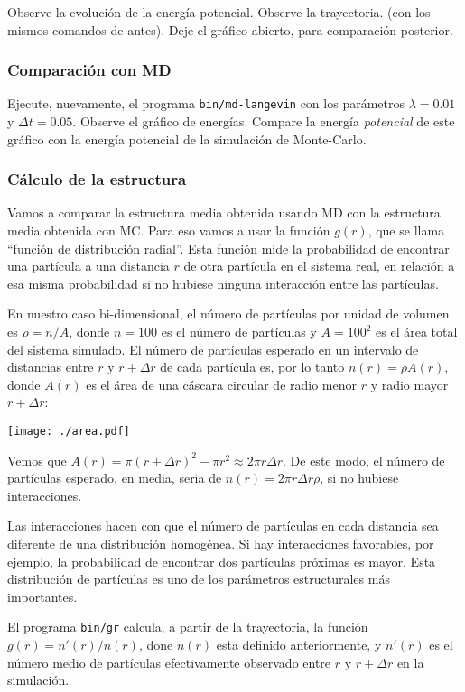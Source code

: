 \documentclass[10pt,a4paper,ssfamily]{exam}
\newcommand{\1}{{\bf 1}}
\newcommand{\2}{{\bf 2}}
\newcommand{\3}{{\bf 3}}
\begin{document}
Observe la evolución de la energía potencial. Observe la trayectoria. 
(con los mismos comandos de antes). Deje el gráfico abierto, para
comparación posterior. 

\subsubsection{Comparación con MD}

Ejecute, nuevamente, el programa {\tt bin/md-langevin} con los
parámetros $\lambda=0.01$ y $\Delta t=0.05$. Observe el gráfico
de energías. Compare la energía {\it potencial} de este gráfico con la
energía potencial de la simulación de Monte-Carlo.

\subsubsection{Cálculo de la estructura}

Vamos a comparar la estructura media obtenida usando MD con la
estructura media obtenida con MC. Para eso vamos a usar la función
$g(r)$, que se llama ``función de distribución radial''. 
Esta función mide la probabilidad de encontrar una partícula a
una distancia $r$ de otra partícula en el sistema real, en relación a
esa misma probabilidad si no hubiese ninguna interacción entre las
partículas. 

En nuestro caso bi-dimensional, el número de partículas por unidad de
volumen es $\rho=n/A$, donde $n=100$ es el número de partículas y $A=100^2$
es el área total del sistema simulado. El número de partículas esperado
en un intervalo de distancias entre $r$ y $r+\Delta r$ de cada partícula
es, por lo tanto $n(r)=\rho A(r)$, donde $A(r)$ es el área de una cáscara
circular de radio menor $r$ y radio mayor $r+\Delta r$:
\begin{center}
\texttt{[image: ./area.pdf]}
\end{center}
Vemos que $A(r)=\pi (r+\Delta r)^2 - \pi r^2 \approx 2\pi r\Delta r$.
De este modo, el número de partículas esperado, en media, seria de 
$n(r)=2\pi r\Delta r\rho$, si no hubiese interacciones. 

Las interacciones hacen con que el número de partículas en cada
distancia sea diferente de una distribución homogénea. Si hay
interacciones favorables, por ejemplo, la probabilidad de encontrar dos
partículas próximas es mayor. Esta distribución de partículas es uno de
los parámetros estructurales más importantes.

El programa {\tt bin/gr} calcula, a partir de la trayectoria, la función
$g(r)=n'(r)/n(r)$, done $n(r)$ esta definido anteriormente, y $n'(r)$ es
el número medio de partículas efectivamente observado entre $r$ y $r+\Delta r$
en la simulación. 
\end{document}
